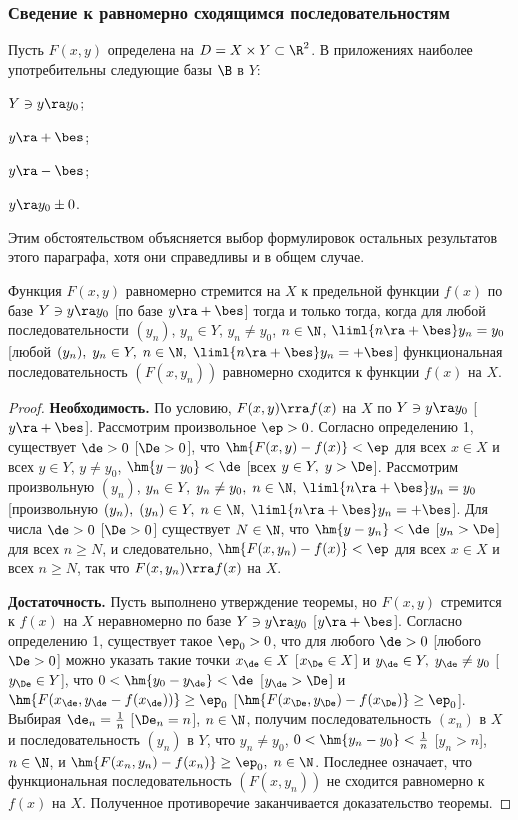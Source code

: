\documentclass[a4paper]{article}
\begin{document}
\subsubsection{Сведение к равномерно сходящимся последовательностям}
Пусть $F(x,y)$ определена на $D=X\times Y\subset \R^2$. В
приложениях наиболее употребительны следующие базы $\B$ в $Y$:
\begin{nums}{-2}
\item $Y\owns y\ra y_0$;
\item $y\ra+\bes$;
\item $y\ra -\bes$;
\item $y\ra y_0\pm 0$.
\end{nums}

Этим обстоятельством объясняется выбор формулировок остальных
результатов этого параграфа, хотя они справедливы и в общем случае.

\begin{theorem}\label{thm3.10}
Функция $F(x,y)$ равномерно стремится на $X$ к предельной функции
$f(x)$ по базе $Y\owns y\ra y_0$ [по базе $y\ra+\bes$] тогда и
только тогда, когда для любой последовательности $(y_n)$, $y_n\in
Y$, $y_n\ne y_0$, $n\in\N$, $\liml{n\ra+\bes} y_n=y_0$ [любой
$(y_n), \; y_n\in Y, \; n\in\N, \; \liml{n\ra+\bes} y_n=+\bes$]
функциональная последовательность $(F(x,y_n))$ равномерно сходится к
функции $f(x)$ на $X$.
\end{theorem}

\begin{proof}
\textbf{Необходимость.} По условию, $F(x,y)\rra f(x)$ на $X$ по
$Y\owns y\ra y_0$ [$y\ra+\bes$]. Рассмотрим произвольное $\ep>0$.
Согласно определению 1, существует $\de>0$ [$\De>0$], что
$\hm{F(x,y)-f(x)}<\ep$ для всех $x\in X$ и всех $y\in Y$, $y\ne
y_0$, $\hm{y-y_0}<\de$ [всех $y\in Y, \; y>\De$]. Рассмотрим
произвольную $(y_n)$, $y_n\in Y, \; y_n\ne y_0, \; n\in\N, \;
\liml{n\ra+\bes} y_n = y_0$ [произвольную $(y_n), \; (y_n)\in Y, \;
n\in \N, \; \liml{n\ra+\bes}y_n = +\bes$]. Для числа $\de>0$
[$\De>0$] существует $N\in\N$, что $\hm{y-y_n}<\de$ [$y_n> \De$] для
всех $n\ge N$, и следовательно, $\hm{F(x,y_n)-f(x)}<\ep$ для всех
$x\in X$ и всех $n\ge N$, так что $F(x,y_n) \rra f(x)$ на $X$.

\textbf{Достаточность.} Пусть выполнено утверждение теоремы, но
$F(x,y)$ стремится к $f(x)$ на $X$ неравномерно по базе $Y\owns y\ra
y_0$ [$y\ra+\bes$]. Согласно определению 1, существует такое
$\ep_0>0$, что для любого $\de>0$ [любого $\De>0$] можно указать
такие точки $x_{\de}\in X$ [$x_{\De}\in X$] и $y_{\de} \in Y, \;
y_{\de}\ne y_0$ [$y_{\De}\in Y$], что $0<\hm{y_0 - y_{\de}}<\de$
[$y_{\de} > \De$] и $\hm{F(x_{\de}, y_{\de} - f(x_{\de}))} \ge
\ep_0$ [$\hm{F(x_{\De},y_{\De}) - f(x_{\De})}\ge\ep_0$]. Выбирая
$\de_n=\frac1n$ [$\De_n=n$], $n\in\N$, получим последовательность
$(x_n)$ в $X$ и последовательность $(y_n)$ в $Y$, что $y_n\ne y_0$,
$0<\hm{y_n-y_0}<\frac1n$ [$y_n>n$], $n\in\N$, и
$\hm{F(x_n,y_n)-f(x_n)}\ge \ep_0, \; n\in\N$. Последнее означает,
что функциональная последовательность $(F(x,y_n))$ не сходится
равномерно к $f(x)$ на $X$. Полученное противоречие заканчивается
доказательство теоремы.
\end{proof}
\end{document}
